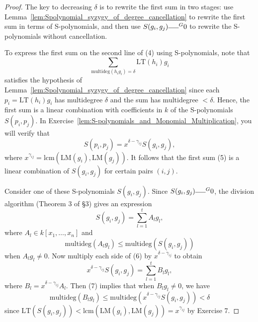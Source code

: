 \begin{proof}
  The key to decreasing $\delta$ is to rewrite the first sum in two stages: use Lemma~\ref{lem:Spolynomial_syzygy_of_degree_cancellation} to rewrite the first sum in terms of S-polynomials, and then use $S(g_i, g_j) \overline{\hspace{1.5em}}^G 0$ to rewrite the S-polynomials without cancellation.

  To express the first sum on the second line of (4) using S-polynomials, note that
  \begin{equation} \tag{5}
  \sum_{\text{multideg}(h_i g_i) = \delta} \text{LT}(h_i) g_i
  \end{equation}
  satisfies the hypothesis of Lemma~\ref{lem:Spolynomial_syzygy_of_degree_cancellation} since each $p_i = \text{LT}(h_i) g_i$ has multidegree $\delta$ and the sum has multidegree $<\delta$.
  Hence, the first sum is a linear combination with coefficients in $k$ of the S-polynomials $S(p_i, p_j)$.
  In Exercise~\ref{lem:S-polynomials_and_Monomial_Multiplication}, you will verify that
  \[
  S(p_i, p_j) = x^{\delta - \gamma_{ij}} S(g_i, g_j),
  \]
  where $x^{\gamma_{ij}} = \text{lcm}(\text{LM}(g_i), \text{LM}(g_j))$. It follows that the first sum (5) is a linear combination of $S(g_i, g_j)$ for certain pairs $(i, j)$.

  Consider one of these S-polynomials $S(g_i, g_j)$. Since $S(g_i, g_j) \overline{\hspace{1.5em}}^G 0$, the division algorithm (Theorem 3 of §3) gives an expression
  \begin{equation} \tag{6}
  S(g_i, g_j) = \sum_{l=1}^t A_l g_l,
  \end{equation}
  where $A_l \in k[x_1, \dots, x_n]$ and
  \begin{equation} \tag{7}
  \text{multideg}(A_l g_l) \le \text{multideg}(S(g_i, g_j))
  \end{equation}
  when $A_l g_l \ne 0$. Now multiply each side of (6) by $x^{\delta - \gamma_{ij}}$ to obtain
  \begin{equation} \tag{8}
  x^{\delta - \gamma_{ij}} S(g_i, g_j) = \sum_{l=1}^t B_l g_l,
  \end{equation}
  where $B_l = x^{\delta - \gamma_{ij}} A_l$. Then (7) implies that when $B_l g_l \ne 0$, we have
  \begin{equation} \tag{9}
  \text{multideg}(B_l g_l) \le \text{multideg}(x^{\delta - \gamma_{ij}} S(g_i, g_j)) < \delta
  \end{equation}
  since $\text{LT}(S(g_i, g_j)) < \text{lcm}(\text{LM}(g_i), \text{LM}(g_j)) = x^{\gamma_{ij}}$ by Exercise 7.


\end{proof}
